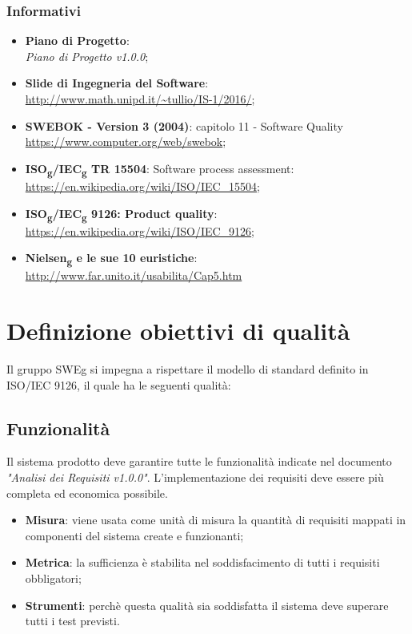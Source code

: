 \documentclass[12pt,a4paper,titlepage]{article}
\begin{document}
	\subsubsection{Informativi}
	\begin{itemize}
		\item \textbf{Piano di Progetto}:\\
		\textit{Piano di Progetto v1.0.0};
		\item \textbf{Slide di Ingegneria del Software}:\\ 
			\textcolor{blue}{\url{http://www.math.unipd.it/~tullio/IS-1/2016/}};
		\item \textbf{SWEBOK - Version 3 (2004)}: capitolo 11 - Software Quality\\
			\textcolor{blue}{\url{https://www.computer.org/web/swebok}};
		\item \textbf{ISO\textsubscript{g}/IEC\textsubscript{g} TR 15504}: Software process assessment:\\
			\textcolor{blue}{\url{https://en.wikipedia.org/wiki/ISO/IEC_15504}};
		\item \textbf{ISO\textsubscript{g}/IEC\textsubscript{g} 9126: Product quality}:\\
			\textcolor{blue}{\url{https://en.wikipedia.org/wiki/ISO/IEC_9126}};
		\item \textbf{Nielsen\textsubscript{g} e le sue 10 euristiche}: \\
			\textcolor{blue}{\url{http://www.far.unito.it/usabilita/Cap5.htm}}
	\end{itemize} 
	
	\newpage
	\section{Definizione obiettivi di qualità}
	Il gruppo SWEg si impegna a rispettare il modello di standard definito in ISO/IEC 9126, il quale ha le seguenti qualità:
		\subsection{Funzionalità}
		Il sistema prodotto deve garantire tutte le funzionalità indicate nel documento \textit{"Analisi dei Requisiti v1.0.0"}. L'implementazione dei requisiti deve essere più completa ed economica possibile.
		\begin{itemize}
			\item \textbf{Misura}: viene usata come unità di misura la quantità di requisiti mappati in componenti del sistema create e funzionanti;
			\item \textbf{Metrica}: la sufficienza è stabilita nel soddisfacimento di tutti i requisiti obbligatori;
			\item \textbf{Strumenti}: perchè questa qualità sia soddisfatta il sistema deve superare tutti i test previsti.
		\end{itemize}
	
\end{document}
